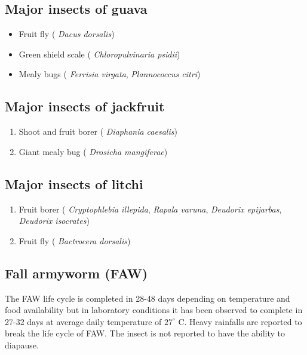 \documentclass[
  openany]{book}
\providecommand{\tightlist}{%
  \setlength{\itemsep}{0pt}\setlength{\parskip}{0pt}}
\begin{document}
\hypertarget{major-insects-of-guava}{%
\subsection{Major insects of guava}\label{major-insects-of-guava}}

\begin{itemize}
\tightlist
\item
  Fruit fly ( \emph{Dacus dorsalis})
\item
  Green shield scale ( \emph{Chloropulvinaria psidii})
\item
  Mealy bugs ( \emph{Ferrisia virgata}, \emph{Plannococcus citri})
\end{itemize}

\hypertarget{major-insects-of-jackfruit}{%
\subsection{Major insects of jackfruit}\label{major-insects-of-jackfruit}}

\begin{enumerate}
\def\labelenumi{\arabic{enumi}.}
\tightlist
\item
  Shoot and fruit borer ( \emph{Diaphania caesalis})
\item
  Giant mealy bug ( \emph{Drosicha mangiferae})
\end{enumerate}

\hypertarget{major-insects-of-litchi}{%
\subsection{Major insects of litchi}\label{major-insects-of-litchi}}

\begin{enumerate}
\def\labelenumi{\arabic{enumi}.}
\tightlist
\item
  Fruit borer ( \emph{Cryptophlebia illepida}, \emph{Rapala varuna}, \emph{Deudorix epijarbas}, \emph{Deudorix isocrates})
\item
  Fruit fly ( \emph{Bactrocera dorsalis})
\end{enumerate}

\hypertarget{fall-armyworm-faw}{%
\subsection{Fall armyworm (FAW)}\label{fall-armyworm-faw}}

The FAW life cycle is completed in 28-48 days depending on temperature and food availability but in laboratory conditions it has been observed to complete in 27-32 days at average daily temperature of \(27^\circ\) C. Heavy rainfalls are reported to break the life cycle of FAW. The insect is not reported to have the ability to diapause.
\end{document}
